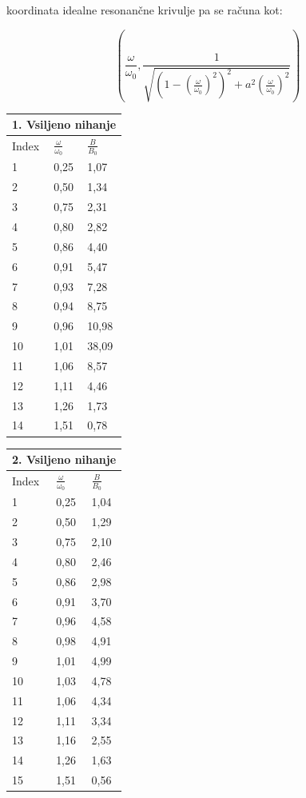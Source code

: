 koordinata idealne resonančne krivulje pa se računa kot:

\centering \Large
\begin{equation}
    (\frac{\omega}{\omega_0} , \frac{1}{\sqrt{(1-{(\frac{\omega}{\omega_0})}^2)^2+a^2({\frac{\omega}{\omega_0}})^2}})
\end{equation}
\raggedright \normalsize

\centering \large
\begin{tabular}{|p{1.5cm}|p{1.5cm}|p{1.5cm}|}
    \hline
    \multicolumn{3}{|c|}{1. Vsiljeno nihanje}\\
    \hline
    Index & $\frac{\omega}{\omega_0}$ & $\frac{B}{B_0}$ \\
    \hline
    1 & 0,25 & 1,07\\
    2 & 0,50 & 1,34\\
    3 & 0,75 & 2,31\\
    4 & 0,80 & 2,82\\
    5 & 0,86 & 4,40\\
    6 & 0,91 & 5,47 \\
    7 & 0,93 & 7,28\\
    8 & 0,94 & 8,75\\
    9 & 0,96 & 10,98\\
    10 & 1,01 & 38,09\\
    11 & 1,06 & 8,57\\
    12 & 1,11 & 4,46\\
    13 & 1,26 & 1,73\\
    14 & 1,51 & 0,78\\
    \hline
\end{tabular}

\begin{tabular}{|p{1.5cm}|p{1.5cm}|p{1.5cm}|}
    \hline
    \multicolumn{3}{|c|}{2. Vsiljeno nihanje}\\
    \hline
    Index & $\frac{\omega}{\omega_0}$ & $\frac{B}{B_0}$ \\
    \hline
    1 & 0,25 & 1,04 \\
    2 & 0,50 & 1,29\\
    3 & 0,75 & 2,10\\
    4 & 0,80 & 2,46\\
    5 & 0,86 & 2,98\\
    6 & 0,91 & 3,70\\
    7 & 0,96 & 4,58\\
    8 & 0,98 & 4,91\\
    9 & 1,01 & 4,99\\
    10 & 1,03 & 4,78\\
    11 & 1,06 & 4,34\\
    12 & 1,11 & 3,34\\
    13 & 1,16 & 2,55\\
    14 & 1,26 & 1,63\\
    15 & 1,51 & 0,56\\
    \hline
\end{tabular}

